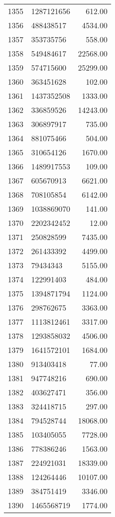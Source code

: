 \begin{table}[ht]
\begin{tabular}{rlr}
  1355 & 1287121656 & 612.00 \\ 
  1356 & 488438517 & 4534.00 \\ 
  1357 & 353735756 & 558.00 \\ 
  1358 & 549484617 & 22568.00 \\ 
  1359 & 574715600 & 25299.00 \\ 
  1360 & 363451628 & 102.00 \\ 
  1361 & 1437352508 & 1333.00 \\ 
  1362 & 336859526 & 14243.00 \\ 
  1363 & 306897917 & 735.00 \\ 
  1364 & 881075466 & 504.00 \\ 
  1365 & 310654126 & 1670.00 \\ 
  1366 & 1489917553 & 109.00 \\ 
  1367 & 605670913 & 6621.00 \\ 
  1368 & 708105854 & 6142.00 \\ 
  1369 & 1038869070 & 141.00 \\ 
  1370 & 2202342452 & 12.00 \\ 
  1371 & 250828599 & 7435.00 \\ 
  1372 & 261433392 & 4499.00 \\ 
  1373 & 79434343 & 5155.00 \\ 
  1374 & 122991403 & 484.00 \\ 
  1375 & 1394871794 & 1124.00 \\ 
  1376 & 298762675 & 3363.00 \\ 
  1377 & 1113812461 & 3317.00 \\ 
  1378 & 1293858032 & 4506.00 \\ 
  1379 & 1641572101 & 1684.00 \\ 
  1380 & 913403418 & 77.00 \\ 
  1381 & 947748216 & 690.00 \\ 
  1382 & 403627471 & 356.00 \\ 
  1383 & 324418715 & 297.00 \\ 
  1384 & 794528744 & 18068.00 \\ 
  1385 & 103405055 & 7728.00 \\ 
  1386 & 778386246 & 1563.00 \\ 
  1387 & 224921031 & 18339.00 \\ 
  1388 & 124264446 & 10107.00 \\ 
  1389 & 384751419 & 3346.00 \\ 
  1390 & 1465568719 & 1774.00 \\ 

\end{tabular}
\end{table}
